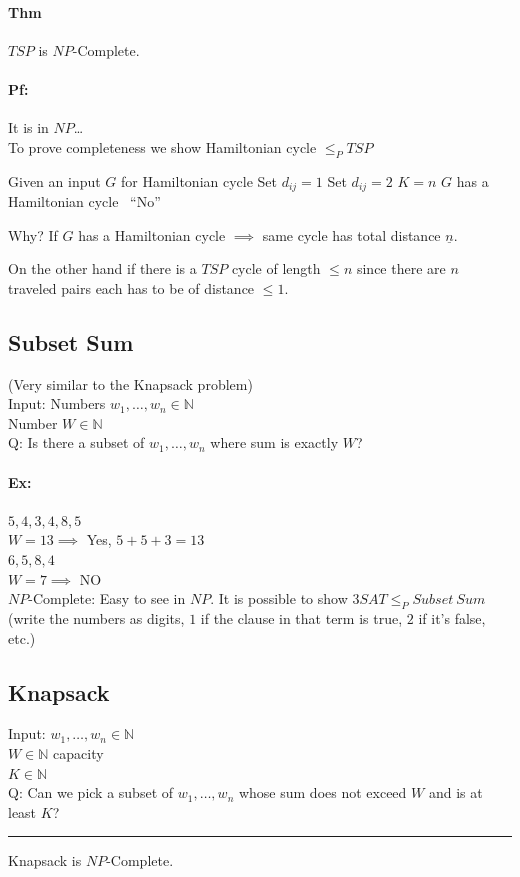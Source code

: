 \documentclass[12 pt]{article}
\begin{document}
          \paragraph{Thm} $TSP$ is $NP$-Complete.
          \paragraph{Pf:} It is in $NP$\ldots
          \\ To prove completeness we show Hamiltonian cycle $\leq_P
          TSP$
          \begin{algorithmic}
            \State Given an input $G$ for Hamiltonian cycle
             Set $d_{ij}=1$
             Set $d_{ij}=2$
            \EndIf
            \State $K=n$
             $G$ has a
            Hamiltonian cycle
            \Else\ ``No''
            \EndIf
          \end{algorithmic}
          Why? If $G$ has a Hamiltonian cycle $\implies$ same cycle
          has total distance $\underline{n}$.

          On the other hand if there is a $TSP$ cycle of length $\leq
          n$ since there are $n$ traveled pairs each has to be of
          distance $\leq 1$.
          \subsection{Subset Sum} (Very similar to the Knapsack
          problem)
          \\ Input: Numbers $w_1, \ldots, w_n \in \mathbb{N}$
          \\ \phantom{Input:} Number $W \in \mathbb{N}$
          \\ Q: Is there a subset of $w_1, \ldots, w_n$ where sum is
          exactly $W$?
          \paragraph{Ex:} $5,4,3,4,8,5$
          \\ $W=13 \implies $ Yes, $5+5+3=13$
          \\ $6,5,8,4$
          \\ $W = 7 \implies$ NO
          \\ $NP$-Complete: Easy to see in $NP$. It is possible to
          show $3SAT \leq_P Subset \ Sum$ (write the numbers as
          digits, $1$ if the clause in that term is true, $2$ if it's
          false, etc.)
          \subsection{Knapsack}
          Input: $w_1, \ldots, w_n \in \mathbb{N}$
          \\ \phantom{Input:} $W \in \mathbb{N}$ capacity
          \\ \phantom{Input:} $K \in \mathbb{N}$
          \\ Q: Can we pick a subset of $w_1, \ldots, w_n$ whose sum
          does not exceed $W$ and is at least $K$?
          \\ \noindent \rule{\textwidth}{0.5pt}
          Knapsack is $NP$-Complete.
\end{document}
